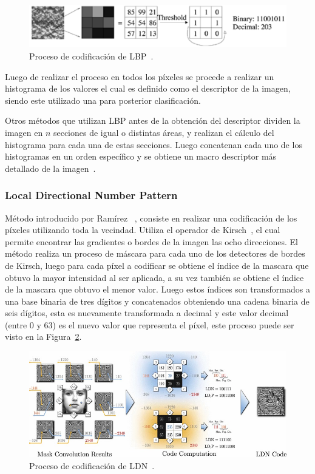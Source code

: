 \begin{figure}[tb]
  \centering
   \includegraphics[width=1\textwidth]{Figuras/lbp.pdf}
  \caption{Proceso de codificación de LBP~\cite{Ahonen2006}.}
  \label{art:fig:lbp}
\end{figure}

Luego de realizar el proceso en todos los píxeles se procede a realizar un histograma de los valores el cual es definido como el descriptor de la imagen, siendo este utilizado una para posterior clasificación.

Otros métodos que utilizan LBP antes de la obtención del descriptor dividen la imagen en $n$ secciones de igual o distintas áreas, y realizan el cálculo del histograma para cada una de estas secciones. Luego concatenan cada uno de los histogramas en un orden específico y se obtiene un macro descriptor más detallado de la imagen~\cite{Ahonen2006}.

		\subsubsection{Local Directional Number Pattern}
		\label{sec:ldn}
		Método introducido por Ramírez \etal~\cite{RamirezRivera2013}, consiste en realizar una codificación de los píxeles utilizando toda la vecindad. Utiliza el operador de Kirsch~\cite{Kirsch1971}, el cual permite encontrar las gradientes o bordes de la imagen las ocho direcciones. El método realiza un proceso de máscara para cada uno de los detectores de bordes de Kirsch, luego para cada píxel a codificar se obtiene el índice de la mascara que obtuvo la mayor intensidad al ser aplicada, a su vez también se obtiene el índice de la mascara que obtuvo el menor valor. Luego estos índices son transformados a una base binaria de tres dígitos y concatenados obteniendo una cadena binaria de seis dígitos, esta es nuevamente transformada a decimal y este valor decimal (entre 0 y 63) es el nuevo valor que representa el píxel, este proceso puede ser visto en la Figura~\ref{art:fig:ldn}.
		
\begin{figure}[tb]
  \centering
   \includegraphics[width=1\textwidth]{Figuras/ldn.jpg}
  \caption{Proceso de codificación de LDN~\cite{RamirezRivera2013}.}
  \label{art:fig:ldn}
\end{figure}

